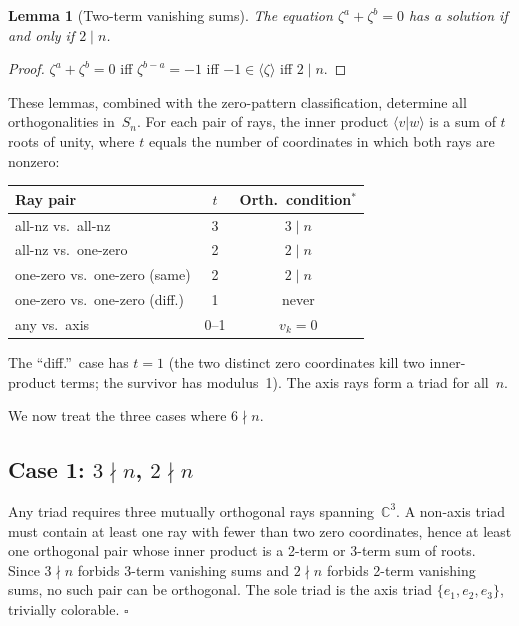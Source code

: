 \documentclass[twocolumn,prl,superscriptaddress,nofootinbib]{revtex4-2}
\newtheorem{lemma}{Lemma}
\newcommand{\C}{\mathbb{C}}
\begin{document}
\begin{lemma}[Two-term vanishing sums]\label{lem:2term}
The equation $\zeta^a + \zeta^b = 0$ has a solution if and only if $2 \mid n$.
\end{lemma}

\begin{proof}
$\zeta^a + \zeta^b = 0$ iff $\zeta^{b-a} = -1$ iff $-1 \in \langle\zeta\rangle$ iff $2 \mid n$.
\end{proof}

These lemmas, combined with the zero-pattern classification, determine all orthogonalities in~$S_n$.  For each pair of rays, the inner product $\langle v | w \rangle$ is a sum of $t$ roots of unity, where $t$ equals the number of coordinates in which both rays are nonzero:

\begin{center}
\begin{tabular}{@{}lcc@{}}
\toprule
Ray pair & $t$ & Orth.\ condition$^*$ \\
\midrule
all-nz vs.\ all-nz & 3 & $3 \mid n$ \\
all-nz vs.\ one-zero & 2 & $2 \mid n$ \\
one-zero vs.\ one-zero (same) & 2 & $2 \mid n$ \\
one-zero vs.\ one-zero (diff.) & 1 & never \\
any vs.\ axis & 0--1 & $v_k = 0$ \\
\bottomrule
\end{tabular}
\end{center}
\smallskip

The ``diff.''\ case has $t = 1$ (the two distinct zero coordinates kill two inner-product terms; the survivor has modulus~1).  The axis rays form a triad for all~$n$.

We now treat the three cases where $6 \nmid n$.

\subsection{Case 1: $3 \nmid n$, $2 \nmid n$}

Any triad requires three mutually orthogonal rays spanning~$\C^3$.  A non-axis triad must contain at least one ray with fewer than two zero coordinates, hence at least one orthogonal pair whose inner product is a 2-term or 3-term sum of roots.  Since $3 \nmid n$ forbids 3-term vanishing sums and $2 \nmid n$ forbids 2-term vanishing sums, no such pair can be orthogonal.  The sole triad is the axis triad $\{e_1, e_2, e_3\}$, trivially colorable. $\square$
\end{document}
